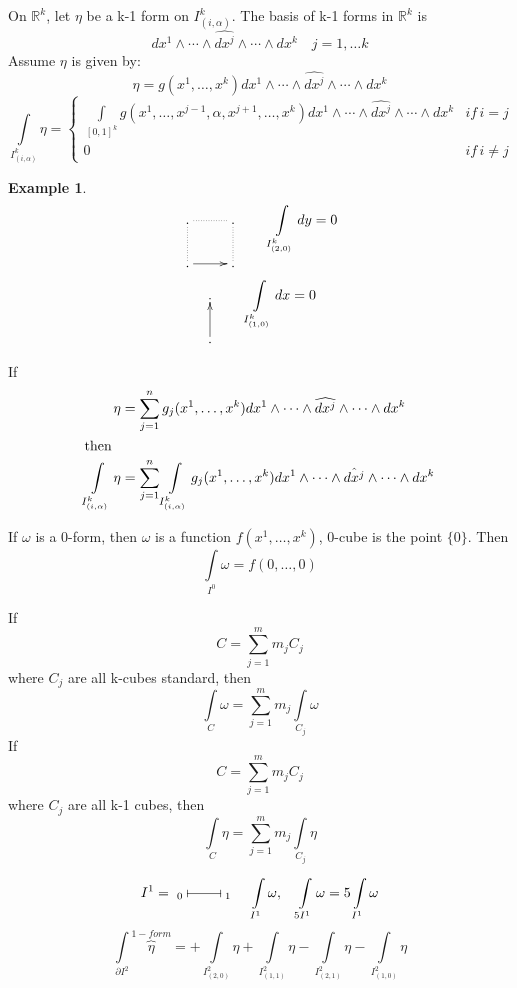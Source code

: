 \documentclass[11pt]{article}
\def\RR{\mathbb{R}}
\newtheorem{example}{Example}[section]
\begin{document}
On $\RR^k$, let $\eta$ be a k-1 form on $I_{(i,\alpha)}^k$. The basis of k-1 forms in $\RR^k$ is 
\[dx^1 \wedge \cdots \wedge \hat{dx^j} \wedge \cdots\wedge dx^k \quad j = 1, \dots k \]
Assume $\eta$ is given by: 
\[\eta = g(x^1 , \dots , x^k) dx^1 \wedge \cdots \wedge \widehat{dx^j} \wedge \cdots\wedge dx^k \]
\[\int\limits_{I_{(i,\alpha)}^k} \eta = \begin{cases}\int\limits_{[0,1]^k}\! \!  g(x^1 , \dots, x^{j-1}, \alpha, x^{j+1}, \dots , x^k) dx^1 \wedge \cdots \wedge \widehat{dx^j} \wedge \cdots\wedge dx^k  &if \, i=j \\
0 & if \, i \neq j \end{cases}\]

\begin{example}

\[\xymatrix{
. \ar@{..}[r] 
& .  \\
.\ar[r] \ar@{..}[u] & .\ar@{..}[u]   } \qquad \int\limits_{I_{(2,0)}^k} dy =0 \]
\[\xymatrix{.   \\
. \ar[u]  } \qquad \int\limits_{I_{(1,0)}^k} dx =0 \]
\end{example}

If 
\begin{align*}
\eta &= \sum_{j=1}^n g_j (x^1 , \dots , x^k) dx^1 \wedge \cdots \wedge \widehat{dx^j} \wedge \cdots\wedge dx^k \\
\intertext{then}
\int\limits_{I_{(i,\alpha)}^k} \eta &= \sum_{j=1}^n \int\limits_{I_{(i,\alpha)}^k} g_j (x^1 , \dots , x^k) dx^1 \wedge \cdots \wedge \hat{dx^j} \wedge \cdots\wedge dx^k 
\end{align*}

If $\omega$ is a 0-form, then $\omega$ is a function $f(x^1, \dots, x^k)$, 0-cube is the point $\{0\}$. Then
\[\int\limits_{I^0} \omega = f(0,\dots , 0)\] 

If 
\[ C = \sum_{j=1}^{m} m_j C_j \]
where $C_j$ are all k-cubes standard, then 
\[ \int\limits_{C}\omega  = \sum_{j=1}^{m} m_j \int\limits_{C_j} \omega \]
If 
\[ C = \sum_{j=1}^{m} m_j C_j \]
where $C_j$ are all k-1 cubes, then  
\[ \int\limits_{C}\eta  = \sum_{j=1}^{m} m_j \int\limits_{C_j} \eta \]

\[I^1 = \xymatrix{
{}_0\ar@{|-|}[r] 
& {}_1} \quad \int\limits_{I^1} \omega, \quad \int\limits_{5I^1} \omega = 5\int\limits_{I^1} \omega\]
\[\int\limits_{\partial I^2} \overbrace{\eta}^{1-form} = + \int\limits_{ I_{(2,0)}^2} \eta  + \int\limits_{ I_{(1,1)}^2} \eta  - \int\limits_{ I_{(2,1)}^2} \eta -\int\limits_{ I_{(1,0)}^2} \eta \]
\end{document}
